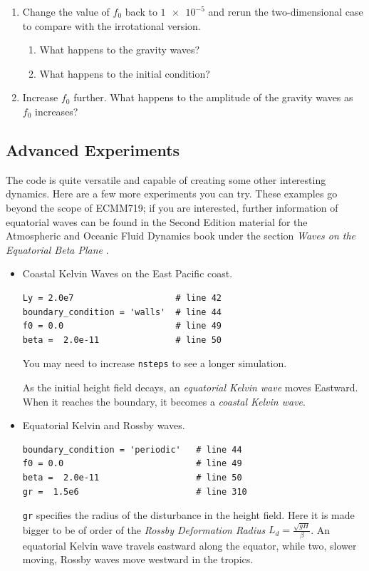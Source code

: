 \documentclass[a4paper, sfsidenotes, twoside]{tufte-handout}
\begin{document}
\begin{itemize}
\begin{enumerate}
      \item Change the value of $f_0$ back to $\num{1e-5}$ and rerun the two-dimensional case to compare with the irrotational version.
      \begin{enumerate}
        \item What happens to the gravity waves?
        \item What happens to the initial condition?
      \end{enumerate}
      \item Increase $f_0$ further.  What happens to the amplitude of the gravity waves as $f_0$ increases?
    \end{enumerate}
  \end{itemize}

\subsection{Advanced Experiments}
\label{sub:advanced}
  The code is quite versatile and capable of creating some other interesting dynamics.
  Here are a few more experiments you can try.
  These examples go beyond the scope of ECMM719; if you are interested, further information of equatorial waves can be found in the Second Edition material for the Atmospheric and Oceanic Fluid Dynamics book under the section \emph{Waves on the Equatorial Beta Plane} \cite{Vallis:2006wb}.
    \begin{itemize}
      \item Coastal Kelvin Waves on the East Pacific coast.
      \begin{verbatim}
Ly = 2.0e7                    # line 42
boundary_condition = 'walls'  # line 44
f0 = 0.0                      # line 49
beta =  2.0e-11               # line 50
      \end{verbatim}
      You may need to increase \texttt{nsteps} to see a longer simulation.

      As the initial height field decays, an \emph{equatorial Kelvin wave} moves Eastward.  When it reaches the boundary, it becomes a \emph{coastal Kelvin wave}.
    \item Equatorial Kelvin and Rossby waves.
          \begin{verbatim}
boundary_condition = 'periodic'   # line 44
f0 = 0.0                          # line 49
beta =  2.0e-11                   # line 50
gr =  1.5e6                       # line 310
          \end{verbatim}
        \texttt{gr} specifies the radius of the disturbance in the height field.
        Here it is made bigger to be of order of the \emph{Rossby Deformation Radius} $L_d = \frac{\sqrt{gH}}{\beta}$.
      An equatorial Kelvin wave travels eastward along the equator, while two, slower moving, Rossby waves move westward in the tropics.
    \end{itemize}
\end{document}
